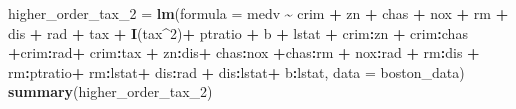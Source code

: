 \documentclass[
]{article}
\newenvironment{Shaded}{\begin{snugshade}}{\end{snugshade}}
\newcommand{\AttributeTok}[1]{\textcolor[rgb]{0.13,0.29,0.53}{#1}}
\newcommand{\DecValTok}[1]{\textcolor[rgb]{0.00,0.00,0.81}{#1}}
\newcommand{\FunctionTok}[1]{\textcolor[rgb]{0.13,0.29,0.53}{\textbf{#1}}}
\newcommand{\NormalTok}[1]{#1}
\newcommand{\OtherTok}[1]{\textcolor[rgb]{0.56,0.35,0.01}{#1}}
\newcommand{\SpecialCharTok}[1]{\textcolor[rgb]{0.81,0.36,0.00}{\textbf{#1}}}
\begin{document}
\begin{Shaded}
\begin{Highlighting}[]
\NormalTok{higher\_order\_tax\_2 }\OtherTok{=} \FunctionTok{lm}\NormalTok{(}\AttributeTok{formula =}\NormalTok{ medv }\SpecialCharTok{\textasciitilde{}}\NormalTok{ crim }\SpecialCharTok{+}\NormalTok{ zn }\SpecialCharTok{+}\NormalTok{ chas }\SpecialCharTok{+}\NormalTok{ nox }\SpecialCharTok{+}\NormalTok{ rm }\SpecialCharTok{+}\NormalTok{ dis }\SpecialCharTok{+}\NormalTok{ rad }\SpecialCharTok{+}\NormalTok{ tax }\SpecialCharTok{+} \FunctionTok{I}\NormalTok{(tax}\SpecialCharTok{\^{}}\DecValTok{2}\NormalTok{)}\SpecialCharTok{+}\NormalTok{ ptratio }\SpecialCharTok{+}\NormalTok{ b }\SpecialCharTok{+}\NormalTok{ lstat }\SpecialCharTok{+}\NormalTok{ crim}\SpecialCharTok{:}\NormalTok{zn }\SpecialCharTok{+}\NormalTok{ crim}\SpecialCharTok{:}\NormalTok{chas  }\SpecialCharTok{+}\NormalTok{crim}\SpecialCharTok{:}\NormalTok{rad}\SpecialCharTok{+}\NormalTok{ crim}\SpecialCharTok{:}\NormalTok{tax }\SpecialCharTok{+}\NormalTok{ zn}\SpecialCharTok{:}\NormalTok{dis}\SpecialCharTok{+}\NormalTok{ chas}\SpecialCharTok{:}\NormalTok{nox }\SpecialCharTok{+}\NormalTok{chas}\SpecialCharTok{:}\NormalTok{rm }\SpecialCharTok{+}\NormalTok{ nox}\SpecialCharTok{:}\NormalTok{rad }\SpecialCharTok{+}\NormalTok{ rm}\SpecialCharTok{:}\NormalTok{dis }\SpecialCharTok{+}\NormalTok{ rm}\SpecialCharTok{:}\NormalTok{ptratio}\SpecialCharTok{+}\NormalTok{ rm}\SpecialCharTok{:}\NormalTok{lstat}\SpecialCharTok{+}\NormalTok{ dis}\SpecialCharTok{:}\NormalTok{rad }\SpecialCharTok{+}\NormalTok{ dis}\SpecialCharTok{:}\NormalTok{lstat}\SpecialCharTok{+}\NormalTok{ b}\SpecialCharTok{:}\NormalTok{lstat, }\AttributeTok{data =}\NormalTok{ boston\_data)}
\FunctionTok{summary}\NormalTok{(higher\_order\_tax\_2)}
\end{Highlighting}
\end{Shaded}
\end{document}
